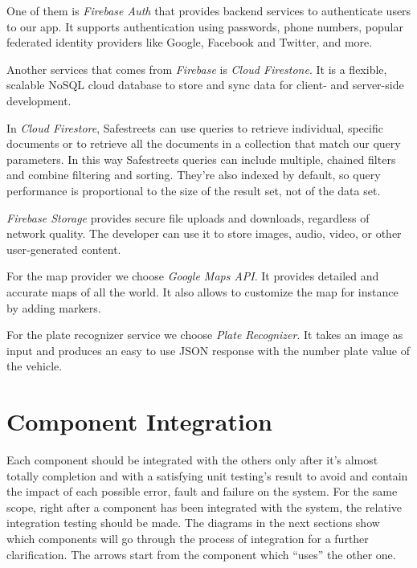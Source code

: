 \documentclass[../RASD.tex]{subfiles}
\begin{document}
\begin{itemize}
        One of them is \textit{Firebase Auth} that provides backend services to authenticate users to our app. It supports authentication using passwords, phone numbers, popular federated identity providers like Google, Facebook and Twitter, and more.

        Another services that comes from \textit{Firebase} is \textit{Cloud Firestone}. It is a flexible, scalable NoSQL cloud database to store and sync data for client- and server-side development.

        In \textit{Cloud Firestore}, Safestreets can use queries to retrieve individual, specific documents or to retrieve all the documents in a collection that match our query parameters. In this way Safestreets queries can include multiple, chained filters and combine filtering and sorting. They're also indexed by default, so query performance is proportional to the size of the result set, not of the data set.

        \textit{Firebase Storage} provides secure file uploads and downloads, regardless of network quality. The developer can use it to store images, audio, video, or other user-generated content.

        For the map provider we choose \textit{Google Maps API}. It provides detailed and accurate maps of all the world. It also allows to customize the map for instance by adding markers.

        For the plate recognizer service we choose \textit{Plate Recognizer}. It takes an image as input and produces an easy to use JSON response with the number plate value of the vehicle.
    \end{itemize}
    \newpage
    \section{Component Integration}\label{sec:component-integration}
    Each component should be integrated with the others only after it’s almost totally completion and with a satisfying unit testing’s result to avoid and contain the impact of each possible error, fault and failure on the system. For the same scope, right after a component has been integrated with the system, the relative integration testing should be made.
    The diagrams in the next sections show which components will go through the process of integration for a further clarification. The arrows start from the component which “uses” the other one.
\end{document}
